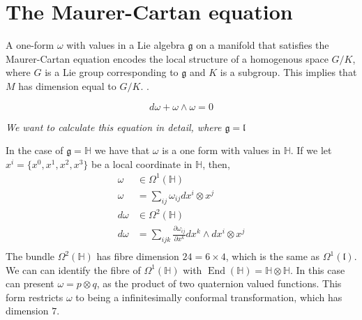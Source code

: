 \documentclass{article}
\newcommand{\HH}{\mathbb{H}}
\newcommand{\lorentz}{\mathfrak{l}}
\newcommand{\g}{\mathfrak{g}}
\newcommand{\End}{\operatorname{End}}
\begin{document}
\section{The Maurer-Cartan equation}

A one-form $\omega$ with values in a Lie algebra $\g$ on a manifold that satisfies the Maurer-Cartan equation encodes the local structure of a homogenous space $G/K$, where $G$ is a Lie group corresponding to $\g$ and $K$ is a subgroup.
This implies that $M$ has dimension equal to $G/K$. \cite{thorne_cartan}.

$$ d \omega + \omega \wedge \omega = 0 $$

\emph{We want to calculate this equation in detail, where $\g=\lorentz$}


In the case of $\g=\HH$ we have that $\omega$ is a one form with values in $\HH$.
If we let $x^i=\{x^0,x^1,x^2,x^3\}$ be a local coordinate in $\HH$, then,
\begin{align*}
  \omega &\in \Omega^1(\HH) \\
  \omega &= \sum_{ij}\omega_{ij} dx^i \otimes x^j\\
  d\omega &\in \Omega^2(\HH) \\
  d\omega &= \sum_{ijk} \frac{\partial \omega_{ij}}{\partial x^k} dx^k \wedge dx^i \otimes x^j\\
\end{align*}
The bundle $\Omega^2(\HH)$ has fibre dimension $24 = 6\times4$, which is the same as $\Omega^1(\lorentz)$.
We can can identify the fibre of $\Omega^1(\HH)$ with $\End(\HH)=\HH\otimes\HH$.
In this case can present $\omega=p\otimes q$, as the product of two quaternion valued functions.
This form restricts $\omega$ to being a infinitesimally conformal transformation, which has dimension $7$.
\end{document}

